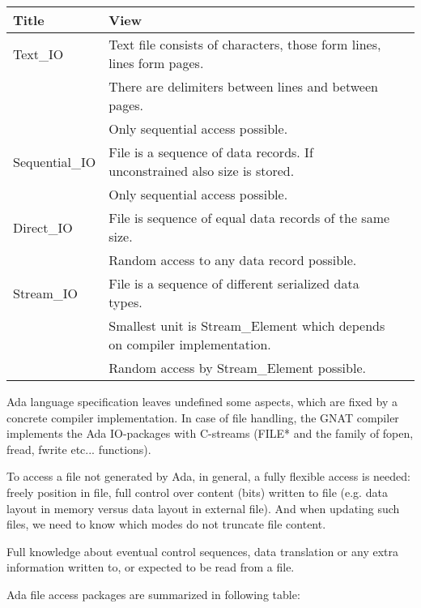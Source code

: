 \documentclass[a4paper,10pt]{article}
\begin{document}
\begin{center}
\begin{tabular}{ l l l  }
 Title         &  View                                                \\
\hline
Text\_IO       &  Text file consists of characters, those form lines, lines form pages.  \\
               &  There are delimiters between lines and between pages.  \\
               &  Only sequential access possible. \\
\hline
Sequential\_IO &  File is a sequence of data records. If unconstrained also size is stored. \\
               &  Only sequential access possible. \\
\hline
Direct\_IO     &  File is sequence of equal data records of the same size. \\
               &  Random access to any data record possible. \\
\hline
Stream\_IO     &  File is a sequence of different serialized data types.  \\
               &  Smallest unit is Stream\_Element which depends on compiler implementation.  \\
               &  Random access by Stream\_Element possible.  \\
\hline
\end{tabular}
\end{center}



Ada language specification leaves undefined some aspects, which are fixed by
a concrete compiler implementation. In case of file handling, the GNAT compiler
implements the Ada IO-packages with C-streams (FILE* and the family of fopen, fread, fwrite etc... functions).

To access a file not generated by Ada, in general, a fully flexible access is needed:
freely position in file, full control over content (bits) written to file 
(e.g. data layout in memory versus data layout in external file). 
And when updating such files, we need to know which modes do not truncate file content.

Full knowledge about eventual control sequences, data translation or any extra information written to, or 
expected to be read from a file.

Ada file access packages are summarized in following table:
\end{document}
